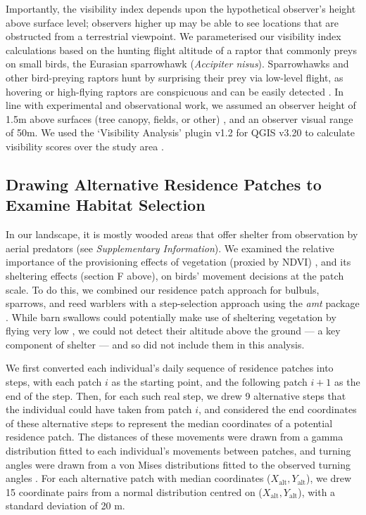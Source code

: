 Importantly, the visibility index depends upon the hypothetical observer's height above surface level; observers higher up may be able to see locations that are obstructed from a terrestrial viewpoint.
We parameterised our visibility index calculations based on the hunting flight altitude of a raptor that commonly preys on small birds, the Eurasian sparrowhawk (\textit{Accipiter nisus}).
Sparrowhawks and other bird-preying raptors hunt by surprising their prey via low-level flight, as hovering or high-flying raptors are conspicuous and can be easily detected \cite{krams2001,krams2020}.
In line with experimental and observational work, we assumed an observer height of 1.5m above surfaces (tree canopy, fields, or other) \citep{seress2011,krams2020}, and an observer visual range of 50m.
We used the `Visibility Analysis' plugin v1.2 for QGIS v3.20 to calculate visibility scores over the study area \citep{cuckovic2016}.

\subsection*{Drawing Alternative Residence Patches to Examine Habitat Selection}

In our landscape, it is mostly wooded areas that offer shelter from observation by aerial predators (see \textit{Supplementary Information}).
We examined the relative importance of the provisioning effects of vegetation (proxied by NDVI) \cite{pettorelli2011}, and its sheltering effects (section F above), on birds' movement decisions at the patch scale.
To do this, we combined our residence patch approach for bulbuls, sparrows, and reed warblers with a step-selection approach \citep{thurfjell2014,avgar2016} using the \textit{amt} package \citep{signer2019}.
While barn swallows could potentially make use of sheltering vegetation by flying very low \cite{warrick2016}, we could not detect their altitude above the ground --- a key component of shelter --- and so did not include them in this analysis.

We first converted each individual's daily sequence of residence patches into steps, with each patch $i$ as the starting point, and the following patch $i+1$ as the end of the step.
Then, for each such real step, we drew 9 alternative steps that the individual could have taken from patch $i$, and considered the end coordinates of these alternative steps to represent the median coordinates of a potential residence patch.
The distances of these movements were drawn from a gamma distribution fitted to each individual's movements between patches, and turning angles were drawn from a von Mises distributions fitted to the observed turning angles \citep{signer2019}.
For each alternative patch with median coordinates ($X_\text{alt}, Y_\text{alt}$), we drew 15 coordinate pairs from a normal distribution centred on ($X_\text{alt}, Y_\text{alt}$), with a standard deviation of 20 m.

